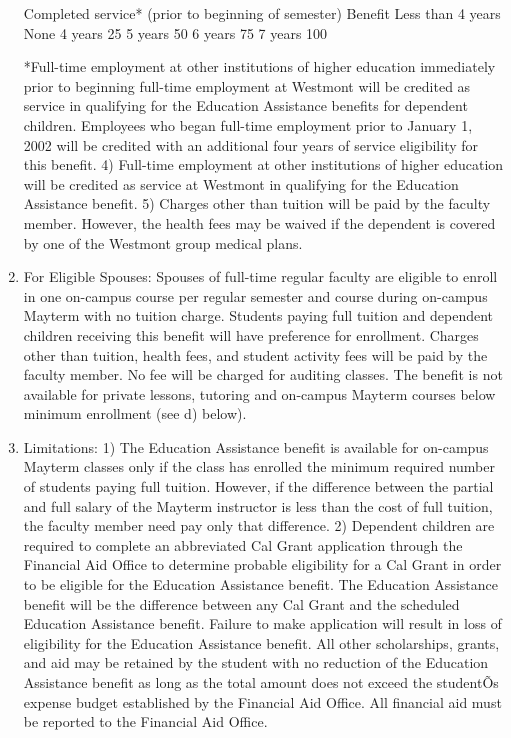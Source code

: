 \documentclass[letterpaper, 11pt]{article}
\begin{document}
\begin{enumerate}[label=\alph*)]
					Completed service* (prior to beginning of semester)
					Benefit
					Less than 4 years
					None
					4 years
					25%
					5 years
					50%
					6 years
					75%
					7 years
					100%

					*Full-time employment at other institutions of higher education immediately prior to beginning full-time employment at Westmont will be credited as service in qualifying for the Education Assistance benefits for dependent children.  Employees who began full-time employment prior to January 1, 2002 will be credited with an additional four years of service eligibility for this benefit.
					4) Full-time employment at other institutions of higher education will be credited as service at Westmont in qualifying for the Education Assistance benefit.
					5) Charges other than tuition will be paid by the faculty member.  However, the health fees may be waived if the dependent is covered by one of the Westmont group medical plans.
					\item{For Eligible Spouses:}
					Spouses of full-time regular faculty are eligible to enroll in one on-campus course per regular semester and course during on-campus Mayterm with no tuition charge.  Students paying full tuition and dependent children receiving this benefit will have preference for enrollment.  Charges other than tuition, health fees, and student activity fees will be paid by the faculty member.  No fee will be charged for auditing classes.  The benefit is not available for private lessons, tutoring and on-campus Mayterm courses below minimum enrollment (see d) below).
					\item{Limitations:}
					1) The Education Assistance benefit is available for on-campus Mayterm classes only if the class has enrolled the minimum required number of students paying full tuition.  However, if the difference between the partial and full salary of the Mayterm instructor is less than the cost of full tuition, the faculty member need pay only that difference.
					2) Dependent children are required to complete an abbreviated Cal Grant application through the Financial Aid Office to determine probable eligibility for a Cal Grant in order to be eligible for the Education Assistance benefit.  The Education Assistance benefit will be the difference between any Cal Grant and the scheduled Education Assistance benefit.  Failure to make application will result in loss of eligibility for the Education Assistance benefit.  All other scholarships, grants, and aid may be retained by the student with no reduction of the Education Assistance benefit as long as the total amount does not exceed the studentÕs expense budget established by the Financial Aid Office.  All financial aid must be reported to the Financial Aid Office.

\end{enumerate}
\end{document}
